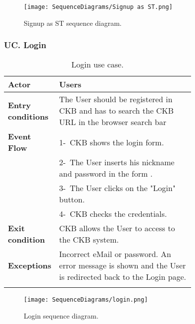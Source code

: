 \begin{figure}[H]
    \begin{center}
        \texttt{[image: SequenceDiagrams/Signup as ST.png]}
        \caption{Signup as ST sequence diagram.}
        \label{fig:signup_as_ST_seqd}%
    \end{center}
\end{figure}

\subsubsection*{UC\cuc . Login}
\begin{center}
    \begin{longtable}{|l|p{0.75\linewidth}|}
        \hline
        \textbf{Actor}            & Users\\
        \hline
        \textbf{Entry conditions} & The User should be registered in CKB and has to search the CKB URL in the browser search bar \\
        \hline
        \textbf{Event Flow}       & 1-\ CKB shows the login form.  \\
        & 2-\ The User inserts his nickname and password in the form .\\
        & 3-\ The User clicks on the "Login" button.       \\                               
        & 4-\ CKB checks the credentials.  \\
        \hline
        \textbf{Exit condition}   & CKB allows the User to access to the CKB system. \\
        \hline
        \textbf{Exceptions}       & Incorrect eMail or password. An error message is shown and the User is redirected back to the Login page. \\
        \hline
        \caption{Login use case.}
        \label{tab: login_use_case}
    \end{longtable}
\end{center}

\begin{figure}[H]
    \begin{center}
        \texttt{[image: SequenceDiagrams/login.png]}
        \caption{Login sequence diagram.}
        \label{fig:login_seqd}%
    \end{center}
\end{figure}

